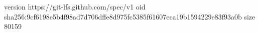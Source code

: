 version https://git-lfs.github.com/spec/v1
oid sha256:9cf6198e5b4f98ad7d706dffe8d975fc5385f61607eca19b1594229e83f93a0b
size 80159
